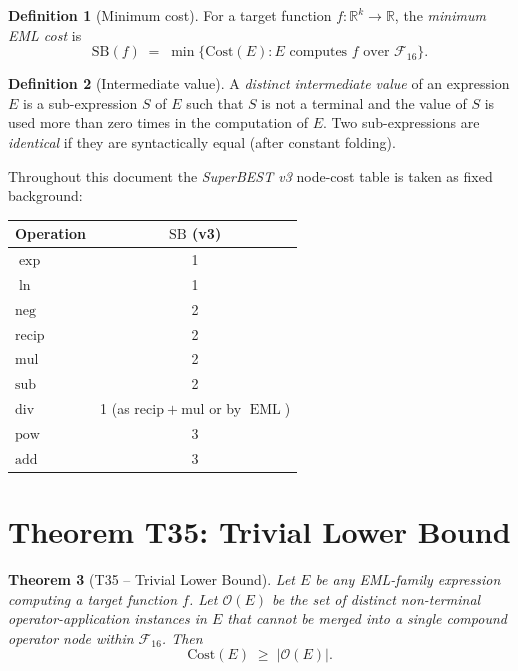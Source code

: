 \documentclass[12pt,a4paper]{article}
\newtheorem{theorem}{Theorem}[section]
\theoremstyle{definition}
\newtheorem{definition}[theorem]{Definition}
\newcommand{\EML}{\operatorname{EML}}
\newcommand{\Cost}{\mathrm{Cost}}
\newcommand{\SB}{\mathrm{SB}}
\newcommand{\Fam}{\mathcal{F}}
\begin{document}
\begin{definition}[Minimum cost]\label{def:mincost}
For a target function $f:\mathbb{R}^k\to\mathbb{R}$, the \emph{minimum EML cost}
is
\[
  \SB(f) \;=\; \min\bigl\{\Cost(E) : E \text{ computes } f \text{ over } \Fam_{16}\bigr\}.
\]
\end{definition}

\begin{definition}[Intermediate value]\label{def:intermediate}
A \emph{distinct intermediate value} of an expression $E$ is a sub-expression
$S$ of $E$ such that $S$ is not a terminal and the value of $S$ is used more
than zero times in the computation of $E$.  Two sub-expressions are
\emph{identical} if they are syntactically equal (after constant folding).
\end{definition}

Throughout this document the \emph{SuperBEST v3} node-cost table is taken as
fixed background:
\begin{center}
\begin{tabular}{@{}lc@{}}
\toprule
\textbf{Operation} & \textbf{$\SB$ (v3)} \\
\midrule
$\exp$   & 1 \\
$\ln$    & 1 \\
$\mathrm{neg}$   & 2 \\
$\mathrm{recip}$ & 2 \\
$\mathrm{mul}$   & 2 \\
$\mathrm{sub}$   & 2 \\
$\mathrm{div}$   & 1 (as $\mathrm{recip}+\mathrm{mul}$ or by $\EML$) \\
$\mathrm{pow}$   & 3 \\
$\mathrm{add}$   & 3 \\
\bottomrule
\end{tabular}
\end{center}

\section{Theorem T35: Trivial Lower Bound}

\begin{theorem}[T35 -- Trivial Lower Bound]\label{thm:T35}
Let $E$ be any EML-family expression computing a target function $f$.
Let $\mathcal{O}(E)$ be the set of distinct non-terminal operator-application
instances in $E$ that cannot be merged into a single compound operator node
within $\Fam_{16}$.  Then
\[
  \Cost(E) \;\geq\; |\mathcal{O}(E)|.
\]
\end{theorem}
\end{document}
